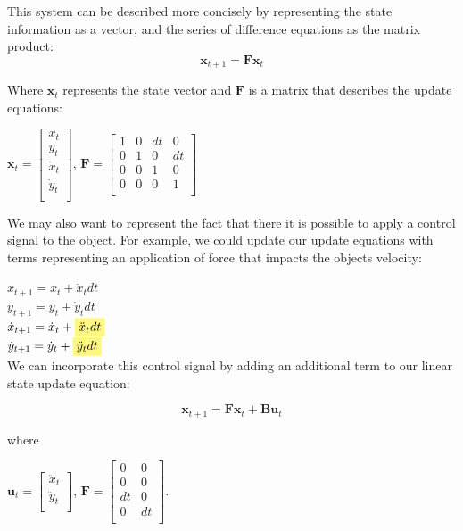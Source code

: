 This system can be described more concisely by representing the
state information as a vector, and the series of difference equations
as the matrix product:
\[
\textbf{x}_{t+1}  = \mathbf{F} \textbf{x}_t
\]

Where $\textbf{x}_t$ represents the state vector and $\mathbf{F}$ is a
matrix that describes the update equations:

$\displaystyle \textbf{x}_t =\begin{bmatrix}
 x_t \\
y_t \\
 \dot{x}_t\\
\dot{y}_t\\
\end{bmatrix}$, \hspace*{.2in}
$\displaystyle \mathbf{F} = 
 \begin{bmatrix}
 1 & 0 & dt & 0 \\
 0 & 1 & 0 & dt \\
 0 & 0 & 1 & 0 \\
 0 & 0 & 0 & 1 \\
\end{bmatrix}$

We may also want to represent the fact that there it is possible to
apply a control signal to the object.  For example, we could update
our update equations with terms representing an application of
force that impacts the objects velocity:

\newcommand{\highlighteq}[1]{%
  \colorbox{yellow!50}{$\displaystyle#1$}}

$x_{t+1} = x_{t} + \dot{x}_t dt$ \\
$y_{t+1} = y_{t} + \dot{y}_t dt$ \\
$\dot{x}_{t+1} =  \dot{x}_t + \highlighteq{\ddot{x}_t dt}$ \\
$\dot{y}_{t+1} =  \dot{y}_t + \highlighteq{\ddot{y}_t dt}$ \\

We can incorporate this control signal by adding an additional term to
our linear state update equation:

\[
\textbf{x}_{t+1}  = \mathbf{F} \textbf{x}_t + \mathbf{B} \textbf{u}_t
\]

where 

$\displaystyle \textbf{u}_t =\begin{bmatrix}
 \ddot{x}_t\\
 \ddot{y}_t\\
\end{bmatrix}$, \hspace*{.2in}
$\displaystyle \mathbf{F} = 
 \begin{bmatrix}
 0 & 0  \\
 0 & 0  \\
 dt & 0  \\
 0 & dt  \\
\end{bmatrix}$.

